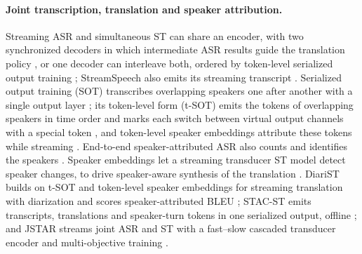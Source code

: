 \paragraph{Joint transcription, translation and speaker attribution.}
Streaming ASR and simultaneous ST can share an encoder, with two synchronized decoders in which intermediate ASR results guide the translation policy \citep{chen2021direct}, or one decoder can interleave both, ordered by token-level serialized output training \citep{papi2023token}; StreamSpeech also emits its streaming transcript \citep{zhang2024streamspeech}. Serialized output training (SOT) transcribes overlapping speakers one after another with a single output layer \citep{kanda2020serialized}; its token-level form (t-SOT) emits the tokens of overlapping speakers in time order and marks each switch between virtual output channels with a special token \citep{kanda2022streaming}, and token-level speaker embeddings attribute these tokens while streaming \citep{kanda2022streamingspeaker}. End-to-end speaker-attributed ASR also counts and identifies the speakers \citep{kanda2020joint,kanda2021end}. Speaker embeddings let a streaming transducer ST model detect speaker changes, to drive speaker-aware synthesis of the translation \citep{wang2025streaming}. DiariST builds on t-SOT and token-level speaker embeddings for streaming translation with diarization and scores speaker-attributed BLEU \citep{yang2024diarist}; STAC-ST emits transcripts, translations and speaker-turn tokens in one serialized output, offline \citep{zuluagagomez2023end}; and JSTAR streams joint ASR and ST with a fast--slow cascaded transducer encoder and multi-objective training \citep{moritz2025transcribing}.

